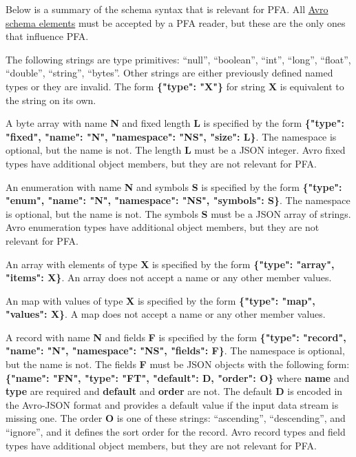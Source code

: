 \documentclass{article}
\newcommand{\PFAc}{\ttfamily\bfseries}
\newcommand{\PFAtp}{\ttfamily\bfseries}
\theoremstyle{definition}
\begin{document}
Below is a summary of the schema syntax that is relevant for PFA.  All \hyperlink{http://avro.apache.org/docs/1.7.6/spec.html}{Avro schema elements} must be accepted by a PFA reader, but these are the only ones that influence PFA.

The following strings are type primitives: ``null'', ``boolean'', ``int'', ``long'', ``float'', ``double'', ``string'', ``bytes''.  Other strings are either previously defined named types or they are invalid.  The form {\PFAc \{"type":$\!$ "X"\}} for string {\PFAtp X} is equivalent to the string on its own.

A byte array with name {\PFAtp N} and fixed length {\PFAtp L} is specified by the form {\PFAc \{"type":$\!$ "fixed", "name":$\!$ "N", "namespace":$\!$ "NS", "size":$\!$ L\}}.  The namespace is optional, but the name is not.  The length {\PFAtp L} must be a JSON integer.  Avro fixed types have additional object members, but they are not relevant for PFA.

An enumeration with name {\PFAtp N} and symbols {\PFAtp S} is specified by the form {\PFAc \{"type":$\!$ "enum", "name":$\!$ "N", "namespace":$\!$ "NS", "symbols":$\!$ S\}}.  The namespace is optional, but the name is not.  The symbols {\PFAtp S} must be a JSON array of strings.  Avro enumeration types have additional object members, but they are not relevant for PFA.

An array with elements of type {\PFAtp X} is specified by the form {\PFAc \{"type":$\!$ "array", "items":$\!$ X\}}.  An array does not accept a name or any other member values.

An map with values of type {\PFAtp X} is specified by the form {\PFAc \{"type":$\!$ "map", "values":$\!$ X\}}.  A map does not accept a name or any other member values.

A record with name {\PFAtp N} and fields {\PFAtp F} is specified by the form {\PFAc \{"type":$\!$ "record", "name":$\!$ "N", "namespace":$\!$ "NS", "fields":$\!$ F\}}.  The namespace is optional, but the name is not.  The fields {\PFAtp F} must be JSON objects with the following form: {\PFAc \{"name":$\!$ "FN", "type":$\!$ "FT", "default":$\!$ D, "order":$\!$ O\}} where {\PFAc name} and {\PFAc type} are required and {\PFAc default} and {\PFAc order} are not.  The default {\PFAtp D} is encoded in the Avro-JSON format and provides a default value if the input data stream is missing one.  The order {\PFAc O} is one of these strings: ``ascending'', ``descending'', and ``ignore'', and it defines the sort order for the record.  Avro record types and field types have additional object members, but they are not relevant for PFA.
\end{document}
